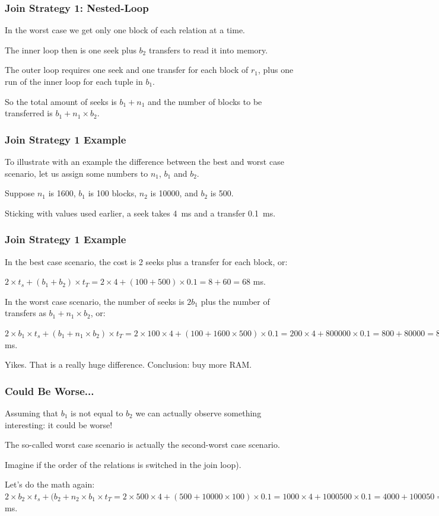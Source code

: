 \begin{frame}
\frametitle{Join Strategy 1: Nested-Loop}

In the worst case we get only one block of each relation at a time. 

The inner loop then is one seek plus $b_{2}$ transfers to read it into memory.

The outer loop requires one seek and one transfer for each block of $r_{1}$, plus one run of the inner loop for each tuple in $b_{1}$. 

So the total amount of seeks is $b_{1} + n_{1}$ and the number of blocks to be transferred is $b_{1} + n_{1} \times b_{2}$.

\end{frame}

\begin{frame}
\frametitle{Join Strategy 1 Example}

To illustrate with an example the difference between the best and worst case scenario, let us assign some numbers to $n_{1}$, $b_{1}$ and $b_{2}$. 

Suppose $n_{1}$ is 1600, $b_{1}$ is 100 blocks, $n_{2}$ is 10000, and $b_{2}$ is 500. 

Sticking with values used earlier, a seek takes 4~ms and a transfer 0.1~ms. 

\end{frame}

\begin{frame}
\frametitle{Join Strategy 1 Example}

In the best case scenario, the cost is 2 seeks plus a transfer for each block, or: 

$2 \times t_{s} + (b_{1} + b_{2}) \times t_{T} = 2 \times 4 + (100 + 500) \times 0.1 = 8 + 60 = 68$ ms. 

In the worst case scenario, the number of seeks is $2b_{1}$ plus the number of transfers as $b_{1} + n_{1} \times b_{2}$, or: 

$2 \times b_{1} \times t_{s} + (b_{1} + n_{1} \times b_{2}) \times t_{T} = 2 \times 100 \times 4 + (100 + 1600 \times 500) \times 0.1 = 200 \times 4 + 800000 \times 0.1 = 800 + 80000 = 80800$ ms. 

Yikes. That is a really huge difference. Conclusion: buy more RAM.

\end{frame}

\begin{frame}
\frametitle{Could Be Worse...}
Assuming that $b_{1}$ is not equal to $b_{2}$ we can actually observe something interesting: it could be worse!

 The so-called worst case scenario is actually the second-worst case scenario. 
 
Imagine if the order of the relations is switched in the join loop). 

Let's do the math again: $2 \times b_{2} \times t_{s} + (b_{2} + n_{2} \times b_{1} \times t_{T} = 2 \times 500 \times 4 + (500 + 10000 \times 100) \times 0.1 = 1000 \times 4 + 1000500 \times 0.1 = 4000 + 100050 = 104050$ ms. 

\end{frame}

